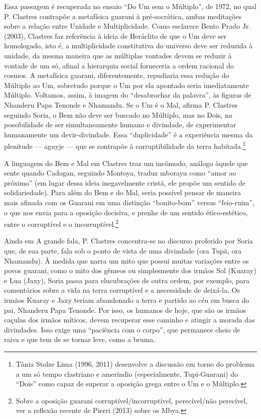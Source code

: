 Essa passagem é recuperada no ensaio ``Do Um sem o Múltiplo'', de 1972, no
qual P. Clastres contrapõe a metafísica guarani à pré-socrática, ambas
meditações sobre a relação entre Unidade e Multiplicidade. Como
esclarece Bento Prado Jr. (2003), Clastres faz referência à ideia de
Heráclito de que o Um deve ser homologado, isto é, a multiplicidade
constitutiva do universo deve ser reduzida à unidade, da mesma maneira
que as múltiplas vontades devem se reduzir à vontade de um só, afinal a
hierarquia social forneceria a ordem racional do cosmos. A metafísica
guarani, diferentemente, repudiaria essa redução do Múltiplo ao Um,
sobretudo porque o Um por ela apontado seria imediatamente Múltiplo.
Voltamos, assim, à imagem do ``desabrochar da palavra'', às figuras de
Nhanderu Papa Tenonde e Nhamandu. Se o Um é o Mal, afirma P. Clastres
seguindo Soria, o Bem não deve ser buscado no Múltiplo, mas no Dois, na
possibilidade de ser simultaneamente humano e divindade, de
experimentar humanamente um devir-divindade. Essa ``duplicidade'' é a
experiência mesma da plenitude — aguyje — que se contrapõe à
corruptibilidade da terra habitada.\footnote{Tânia Stolze Lima (1996,
2011) desenvolve a discussão em torno do problema a um só tempo
clastriano e ameríndio (especialmente, Tupi-Guarani) do ``Dois'' como
capaz de superar a oposição grega entre o Um e o Múltiplo.}

A linguagem do Bem e Mal em Clastres traz um incômodo, análogo àquele
que sente quando Cadogan, seguindo Montoya, traduz mborayu como ``amor
ao próximo'' (em lugar dessa ideia inegavelmente cristã, ele propõe um sentido
de solidariedade). Para além do Bem e do Mal, seria
possível pensar de maneira mais afinada com os Guarani em uma distinção
``bonito-bom'' versus ``feio-ruim'', o que nos envia para a oposição decisiva,
e prenhe de um sentido ético-estético, entre o corruptível e o
incorruptível.\footnote{Sobre a oposição guarani
corruptível/incorruptível, perecível/não perecível, ver a reflexão
recente de Pierri (2013) sobre os Mbya. } 

Ainda em A grande fala, P. Clastres concentra-se no discurso proferido
por Soria que, de sua parte, fala sob o ponto de vista de uma divindade
(ora Tupã, ora Nhamandu). À medida que narra um mito que possui muitas
variações entre os povos guarani, como o mito dos gêmeos ou
simplesmente dos irmãos Sol (Kuaray) e Lua (Jaxy), Soria passa para
elucubrações de outra ordem, por exemplo, para comentários sobre a vida
na terra corruptível e a necessidade de deixá-la. Os irmãos Kuaray e
Jaxy teriam abandonado a terra e partido ao céu em busca do pai,
Nhanderu Papa Tenonde. Por isso, os humanos de hoje, que são os irmãos
caçulas dos irmãos míticos, devem recuperar esse caminho e atingir a
morada das divindades. Isso exige uma ``paciência com o corpo'', que
permanece cheio de raiva e que tem de se tornar leve, como a bruma. 

